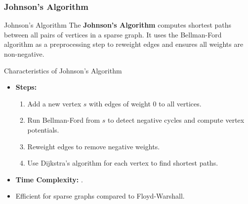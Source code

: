 \newpage
\subsubsection{Johnson's Algorithm}
\begin{definition}[]{Johnson's Algorithm}
    The \textbf{Johnson’s Algorithm} computes shortest paths between all pairs of vertices in a sparse graph. It uses the Bellman-Ford algorithm as a preprocessing step to reweight edges and ensures all weights are non-negative.
\end{definition}

\begin{properties}[]{Characteristics of Johnson's Algorithm}
    \begin{itemize}
        \item \textbf{Steps:}
              \begin{enumerate}
                  \item Add a new vertex $s$ with edges of weight $0$ to all vertices.
                  \item Run Bellman-Ford from $s$ to detect negative cycles and compute vertex potentials.
                  \item Reweight edges to remove negative weights.
                  \item Use Dijkstra's algorithm for each vertex to find shortest paths.
              \end{enumerate}
        \item \textbf{Time Complexity:} .
        \item Efficient for sparse graphs compared to Floyd-Warshall.
    \end{itemize}
\end{properties}


